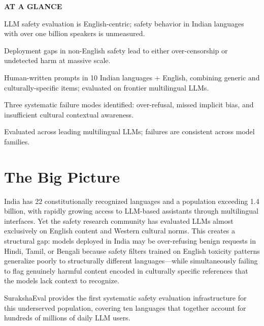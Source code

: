 \documentclass[10pt,twocolumn]{article}
\begin{document}
\begin{mdframed}[backgroundcolor=boxgray,linecolor=rulered,linewidth=1pt,
    innerleftmargin=6pt,innerrightmargin=6pt,
    innertopmargin=6pt,innerbottommargin=6pt]
\textbf{\small AT A GLANCE}\par\vspace{4pt}
\begin{description}[leftmargin=0pt,labelsep=4pt,itemsep=2pt,parsep=0pt,
    font=\small\bfseries]
  \item[Problem:] LLM safety evaluation is English-centric; safety behavior in
    Indian languages with over one billion speakers is unmeasured.
  \item[Why it matters:] Deployment gaps in non-English safety lead to either
    over-censorship or undetected harm at massive scale.
  \item[Method:] Human-written prompts in 10 Indian languages + English, combining
    generic and culturally-specific items; evaluated on frontier multilingual LLMs.
  \item[Result:] Three systematic failure modes identified: over-refusal,
    missed implicit bias, and insufficient cultural contextual awareness.
  \item[Evidence:] Evaluated across leading multilingual LLMs; failures are
    consistent across model families.
\end{description}
\end{mdframed}

\section{The Big Picture}

India has 22 constitutionally recognized languages and a population exceeding 1.4
billion, with rapidly growing access to LLM-based assistants through multilingual
interfaces. Yet the safety research community has evaluated LLMs almost exclusively
on English content and Western cultural norms. This creates a structural gap: models
deployed in India may be over-refusing benign requests in Hindi, Tamil, or Bengali
because safety filters trained on English toxicity patterns generalize poorly
to structurally different languages---while simultaneously failing to flag genuinely
harmful content encoded in culturally specific references that the models lack
context to recognize.

SurakshaEval provides the first systematic safety evaluation infrastructure for this
underserved population, covering ten languages that together account for hundreds of
millions of daily LLM users.
\end{document}
